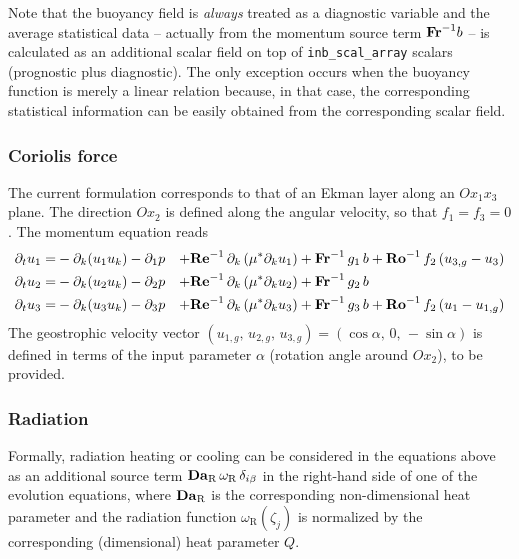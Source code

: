 Note that the buoyancy field is {\it always} treated as a diagnostic variable and the average statistical data -- actually from the momentum source term $\mathrm{\bf Fr}^{-1}b$ -- is calculated as an additional scalar field on top of {\tt   inb\_scal\_array} scalars (prognostic plus diagnostic). The only exception occurs when the buoyancy function is merely a linear relation because, in that case, the corresponding statistical information can be easily obtained from the corresponding scalar field.

\subsubsection{Coriolis force}

The current formulation corresponds to that of an Ekman layer along an $Ox_1x_3$ plane. The direction $Ox_2$ is defined along the angular velocity, so that $f_1=f_3=0$. The momentum equation reads 
\begin{subequations}
    \begin{align}
        \partial_t  u_1 =& -\partial_k ( u_1 u_k ) -\partial_1 p &
        +\mathrm{\bf Re}^{-1}\,\partial_k  \left( \mu^{*} \partial_k u_1\right) &
        +\mathrm{\bf Fr}^{-1}\, g_1\,b +\mathrm{\bf Ro}^{-1}\,f_2\,(u_{3,g}-u_3) \\
        \partial_t  u_2 =& -\partial_k ( u_2 u_k ) -\partial_2 p &
        +\mathrm{\bf Re}^{-1}\,\partial_k  \left( \mu^{*} \partial_k u_2\right) &
        +\mathrm{\bf Fr}^{-1}\, g_2\,b \\
        \partial_t  u_3 =& -\partial_k ( u_3 u_k ) -\partial_3 p &
        +\mathrm{\bf Re}^{-1}\,\partial_k  \left( \mu^{*} \partial_k u_3\right) &
        +\mathrm{\bf Fr}^{-1}\, g_3\,b +\mathrm{\bf Ro}^{-1}\,f_2\,(u_1-u_{1,g})
    \end{align}
\end{subequations}
The geostrophic velocity vector $(u_{1,g},\,u_{2,g},\,u_{3,g}) = (\cos\alpha,\,0,\,-\sin\alpha)$ is defined in terms of the input parameter $\alpha$ (rotation angle around $Ox_2$), to be provided.

\subsubsection{Radiation}

Formally, radiation heating or cooling can be considered in the equations above as an additional source term $\mathrm{\bf Da}_\mathrm{R}\,\omega_\mathrm{R}\,\delta_{i\beta}$ in the right-hand side of one of the evolution equations, where $\mathrm{\bf Da}_\mathrm{R}$ is the corresponding non-dimensional heat parameter and the radiation function $\omega_\mathrm{R}(\zeta_j)$ is normalized by the corresponding (dimensional) heat parameter $Q$. 

